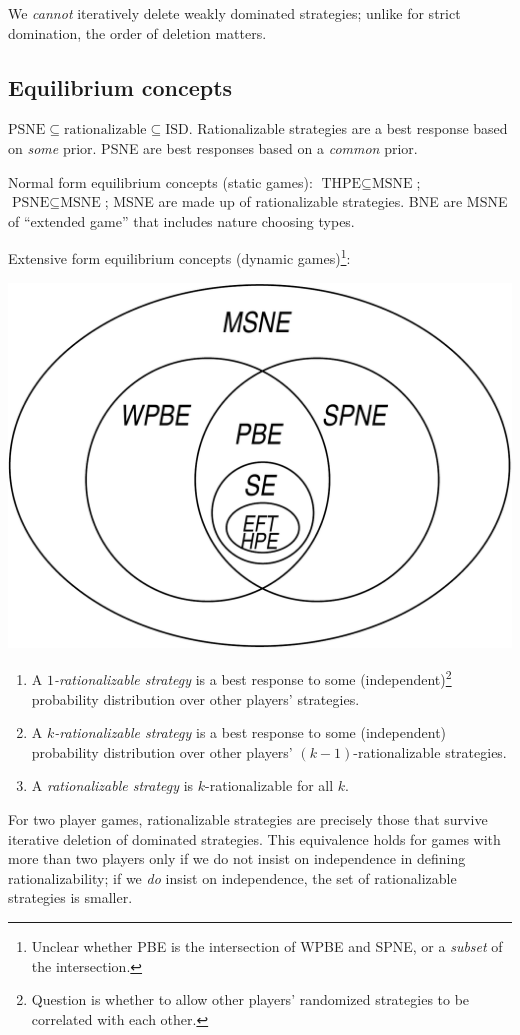 \documentclass[8pt,letterpaper, landscape]{extarticle} %
\begin{document}
\begin{multicols}{3}
\begin{description}
We \textit{cannot} iteratively delete weakly dominated strategies; unlike for strict domination, the order of deletion matters.

\subsection{Equilibrium concepts}
$ \text{PSNE} \subseteq \text{rationalizable} \subseteq \text{ISD} $.
Rationalizable strategies are a best response based on \textit{some} prior. PSNE are best responses based on a \textit{common} prior.

Normal form equilibrium concepts (static games): 
$ \text{THPE} \subseteq \text{MSNE} $; $ \text{PSNE} \subseteq \text{MSNE} $;
MSNE are made up of rationalizable strategies. BNE are MSNE of ``extended game'' that includes nature choosing types.

Extensive form equilibrium concepts (dynamic games)\footnote{Unclear whether PBE is the intersection of WPBE and SPNE, or a \textit{subset} of the intersection.}:
\begin{center} \includegraphics[width=.6\linewidth]{equil} \end{center}

\begin{enumerate}
\item A \textit{$ 1 $-rationalizable strategy} is a best response to some (independent)\footnote{Question is whether to allow other players' randomized strategies to be correlated with each other.} probability distribution over other players' strategies.
\item A \textit{$ k $-rationalizable strategy} is a best response to some (independent) probability distribution over other players' $ (k-1) $-rationalizable strategies.
\item A \textit{rationalizable strategy} is $ k $-rationalizable for all $ k $.
\end{enumerate}
For two player games, rationalizable strategies are precisely those that survive iterative deletion of dominated strategies. This equivalence holds for games with more than two players only if we do not insist on independence in defining rationalizability; if we \textit{do} insist on independence, the set of rationalizable strategies is smaller.


\end{description}
\end{multicols}
\end{document}
